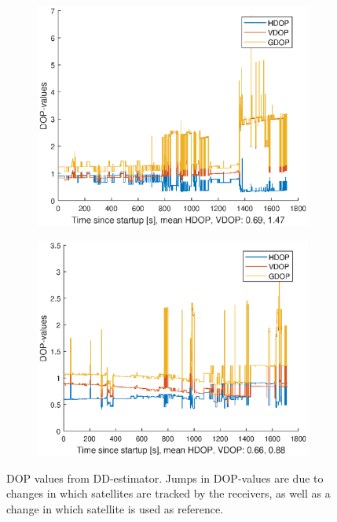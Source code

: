 \begin{figure}[!h]
\begin{subfigure}{\textwidth}
\includegraphics[width=\textwidth]{Results/DDDOPN}
\end{subfigure}
\begin{subfigure}{\textwidth}
\includegraphics[width=\textwidth]{Results/DDDOPE}
\end{subfigure}
\caption{DOP values from DD-estimator. Jumps in DOP-values are due to changes in which satellites are tracked by the receivers, as well as a change in which satellite is used as reference.}
\end{figure}


